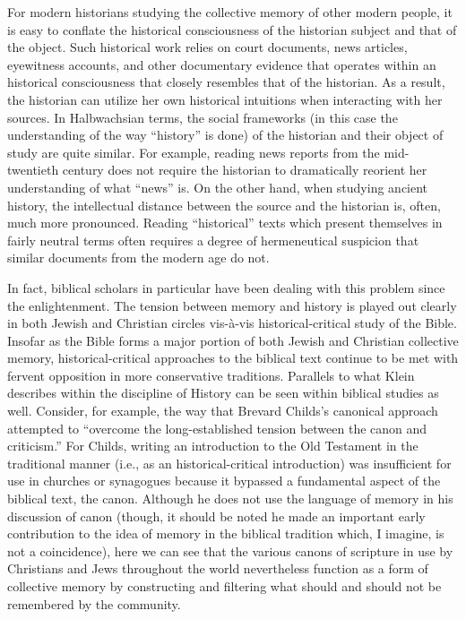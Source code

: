 For modern historians studying the collective memory of other modern
people, it is easy to conflate the historical consciousness of the
historian subject and that of the object. Such historical work relies on
court documents, news articles, eyewitness accounts, and other
documentary evidence that operates within an historical consciousness
that closely resembles that of the historian. As a result, the historian
can utilize her own historical intuitions when interacting with her
sources. In Halbwachsian terms, the social frameworks (in this case the
understanding of the way ``history'' is done) of the historian and their
object of study are quite similar. For example, reading news reports
from the mid-twentieth century does not require the historian to
dramatically reorient her understanding of what ``news'' is. On the
other hand, when studying ancient history, the intellectual distance
between the source and the historian is, often, much more pronounced.
Reading ``historical'' texts which present themselves in fairly neutral
terms often requires a degree of hermeneutical suspicion that similar
documents from the modern age do not.

In fact, biblical scholars in particular have been dealing with this
problem since the enlightenment. The tension between memory and history
is played out clearly in both Jewish and Christian circles vis-à-vis
historical-critical study of the Bible. Insofar as the Bible forms a
major portion of both Jewish and Christian collective memory,
historical-critical approaches to the biblical text continue to be met
with fervent opposition in more conservative traditions. Parallels to
what Klein describes within the discipline of History can be seen within
biblical studies as well. Consider, for example, the way that Brevard
Childs's canonical approach attempted to ``overcome the long-established
tension between the canon and criticism.''\autocite[45]{childs1979} For
Childs, writing an introduction to the Old Testament in the traditional
manner (i.e., as an historical-critical introduction) was insufficient
for use in churches or synagogues because it bypassed a fundamental
aspect of the biblical text, the canon. Although he does not use the
language of memory in his discussion of canon (though, it should be
noted he made an important early contribution to the idea of memory in
the biblical tradition which, I imagine, is not a
coincidence\autocite{childs1962}), here we can see that the various
canons of scripture in use by Christians and Jews throughout the world
nevertheless function as a form of collective memory by constructing and
filtering what should and should not be remembered by the community.

